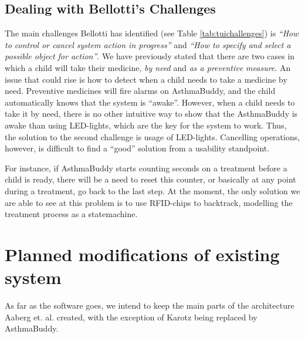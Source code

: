 \subsection{Dealing with Bellotti's Challenges}
\label{sec:handling-challenges}
The main challenges Bellotti has identified (see Table \ref{tab:tuichallenges}) is \emph{``How to control or cancel system action in progress''} and \emph{``How to specify and select a possible object for action''}. We have previously stated that there are two cases in which a child will take their medicine, \emph{by need} and \emph{as a preventive measure}. An issue that could rise is how to detect when a child needs to take a medicine by need. Preventive medicines will fire alarms on AsthmaBuddy, and the child automatically knows that the system is ``awake''. However, when a child needs to take it by need, there is no other intuitive way to show that the AsthmaBuddy is awake than using LED-lights, which are the key for the system to work. Thus, the solution to the second challenge is usage of LED-lights. Cancelling operations, however, is difficult to find a ``good'' solution from a usability standpoint. 

For instance, if AsthmaBuddy starts counting seconds on a treatment before a child is ready, there will be a need to reset this counter, or basically at any point during a treatment, go back to the last step. At the moment, the only solution we are able to see at this problem is to use RFID-chips to backtrack, modelling the treatment process as a statemachine. 



\section{Planned modifications of existing system}
\label{sec:plannedmodsofexistingsystems}
As far as the software goes, we intend to keep the main parts of the architecture Aaberg et. al. created, with the exception of Karotz being replaced by AsthmaBuddy. 


